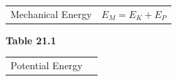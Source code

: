 {{\begin{center}
\begin{tabular}[t]{|l|l|}
    
        Mechanical Energy &
    
    
        
                \begin{math}{E}_{M}={E}_{K}+{E}_{P}\end{math}
     \tabularnewline\cline{1-1}\cline{2-2}
    \end{tabular}
      \end{center}
    \begin{center}{\small\bfseries Table 21.1}\end{center}
    
    \addtocounter{footnote}{-0}
    
          }{ %
        
    
        \begin{center}
      
      \label{m38786*id71092}
      
    \noindent
      \tablelasttail{}
      \begin{xtabular}[t]{|l|l|}\hline
    
    
        Potential Energy &
    
    
        

\end{xtabular}
\end{center}}}
